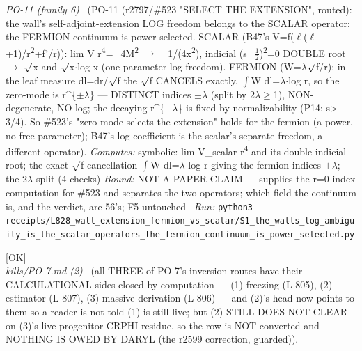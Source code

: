 \begin{description}
\textit{PO-11 (family 6)} \ (PO-11 (r2797/\#523 "SELECT THE EXTENSION", routed): the wall's self-adjoint-extension LOG freedom belongs to the SCALAR operator; the FERMION continuum is power-selected. SCALAR (B47's V=f(\ensuremath{\ell}(\ensuremath{\ell}+1)/r\textsuperscript{2}+f'/r)): lim V r\textsuperscript{4}=\ensuremath{-}4M\textsuperscript{2} \ensuremath{\to} \ensuremath{-}1/(4x\textsuperscript{2}), indicial (s\ensuremath{-}\ensuremath{\tfrac12})\textsuperscript{2}=0 DOUBLE root \ensuremath{\to} \ensuremath{\surd}x and \ensuremath{\surd}x\ensuremath{\cdot}log x (one-parameter log freedom). FERMION (W=\ensuremath{\lambda}\ensuremath{\surd}f/r): in the leaf measure dl=dr/\ensuremath{\surd}f the \ensuremath{\surd}f CANCELS exactly, \ensuremath{\int}W dl=\ensuremath{\lambda}\ensuremath{\cdot}log r, so the zero-mode is r\textasciicircum{}\{\ensuremath{\pm}\ensuremath{\lambda}\} --- DISTINCT indices \ensuremath{\pm}\ensuremath{\lambda} (split by 2\ensuremath{\lambda}\ensuremath{\ge}1), NON-degenerate, NO log; the decaying r\textasciicircum{}\{+\ensuremath{\lambda}\} is fixed by normalizability (P14: s>\ensuremath{-}3/4). So \#523's "zero-mode selects the extension" holds for the fermion (a power, no free parameter); B47's log coefficient is the scalar's separate freedom, a different operator). 
\emph{Computes:} symbolic: lim V\_scalar r\textsuperscript{4} and its double indicial root; the exact \ensuremath{\surd}f cancellation \ensuremath{\int}W dl=\ensuremath{\lambda} log r giving the fermion indices \ensuremath{\pm}\ensuremath{\lambda}; the 2\ensuremath{\lambda} split (4 checks)
 \emph{Bound:} NOT-A-PAPER-CLAIM --- supplies the r=0 index computation for \#523 and separates the two operators; which field the continuum is, and the verdict, are 56's; F5 untouched
\ \emph{Run:} \texttt{python3 receipts/L828\_wall\_extension\_fermion\_vs\_scalar/S1\_the\_walls\_log\_ambiguity\_is\_the\_scalar\_operators\_the\_fermion\_continuum\_is\_power\_selected.py}
\item[\label{rcpt:S1_all_three_po7_inversion_routes_are_closed_by_computation}\texttt{S1\_all\_three\_po7\_inversion\_routes\_are\_closed\_by\_computation}]\hfill\textsf{[OK]}\\
\textit{kills/PO-7.md (2)} \ (all THREE of PO-7's inversion routes have their CALCULATIONAL sides closed by computation --- (1) freezing (L-805), (2) estimator (L-807), (3) massive derivation (L-806) --- and (2)'s head now points to them so a reader is not told (1) is still live; but (2) STILL DOES NOT CLEAR on (3)'s live progenitor-CRPHI residue, so the row is NOT converted and NOTHING IS OWED BY DARYL (the r2599 correction, guarded)). 

\end{description}
